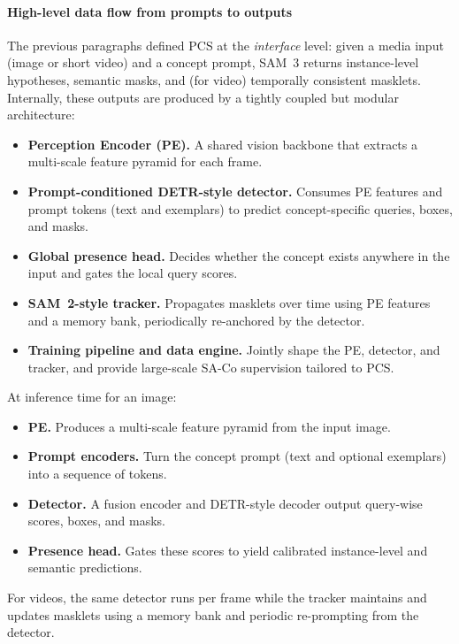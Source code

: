 \begin{enrichment}
\begin{enrichment}
		\paragraph{High-level data flow from prompts to outputs}
		
		The previous paragraphs defined PCS at the \emph{interface} level: given a media input (image or short video) and a concept prompt, SAM~3 returns instance-level hypotheses, semantic masks, and (for video) temporally consistent masklets. Internally, these outputs are produced by a tightly coupled but modular architecture:
		\begin{itemize}
			\item \textbf{Perception Encoder (PE).} A shared vision backbone that extracts a multi-scale feature pyramid for each frame.
			\item \textbf{Prompt-conditioned DETR-style detector.} Consumes PE features and prompt tokens (text and exemplars) to predict concept-specific queries, boxes, and masks.
			\item \textbf{Global presence head.} Decides whether the concept exists anywhere in the input and gates the local query scores.
			\item \textbf{SAM~2-style tracker.} Propagates masklets over time using PE features and a memory bank, periodically re-anchored by the detector.
			\item \textbf{Training pipeline and data engine.} Jointly shape the PE, detector, and tracker, and provide large-scale SA-Co supervision tailored to PCS.
		\end{itemize}
		
		At inference time for an image:
		\begin{itemize}
			\item \textbf{PE.} Produces a multi-scale feature pyramid from the input image.
			\item \textbf{Prompt encoders.} Turn the concept prompt (text and optional exemplars) into a sequence of tokens.
			\item \textbf{Detector.} A fusion encoder and DETR-style decoder output query-wise scores, boxes, and masks.
			\item \textbf{Presence head.} Gates these scores to yield calibrated instance-level and semantic predictions.
		\end{itemize}
		For videos, the same detector runs per frame while the tracker maintains and updates masklets using a memory bank and periodic re-prompting from the detector.
		

\end{enrichment}
\end{enrichment}
